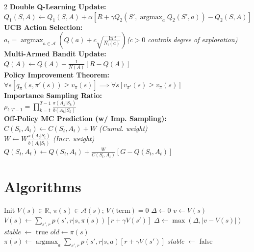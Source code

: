\documentclass[10pt]{article}
\DeclareMathOperator*{\argmax}{argmax}
\begin{document}
\begin{multicols*}{2}
	\textbf{Double Q-Learning Update:}\\
	$Q_1(S,A) \leftarrow Q_1(S,A) + \alpha[R + \gamma Q_2(S', \argmax_a Q_2(S',a)) - Q_2(S,A)]$\\[1ex]
	\textbf{UCB Action Selection:}\\
	$a_t = \argmax_{a \in \mathcal{A}}\left(Q(a) + c\sqrt{\frac{\ln{t}}{N_t(a)}}\right)$\hfill \textit{($c>0$ controls degree of exploration)}\\[1ex]
	\textbf{Multi-Armed Bandit Update:}\\
	$Q(A) \leftarrow Q(A) + \frac{1}{N(A)}[R - Q(A)]$\\[1ex]
	\textbf{Policy Improvement Theorem:}\\
	$\forall s [q_\pi(s, \pi'(s)) \ge v_\pi(s)] \implies \forall s[v_{\pi'}(s) \ge v_\pi(s)]$\\[1ex]
	\textbf{Importance Sampling Ratio:}\\
	$\rho_{t:T-1} = \prod_{k=t}^{T-1}{\frac{\pi(A_k|S_k)}{b(A_k|S_k)}}$\\[1ex]
	\textbf{Off-Policy MC Prediction (w/ Imp. Sampling):}\\
	$C(S_t, A_t) \leftarrow C(S_t, A_t) + W$ \hfill \textit{(Cumul. weight)}\\
	$W \leftarrow W \frac{\pi(A_t|S_t)}{b(A_t|S_t)}$ \hfill \textit{(Incr. weight)}\\
	$Q(S_t, A_t) \leftarrow Q(S_t, A_t) + \frac{W}{C(S_t, A_t)}[G - Q(S_t, A_t)]$

	\vspace{1ex}
	\section*{Algorithms}

	\begin{algorithm}[H]
		\caption{Policy Iteration ($V \approx v_*, \pi \approx \pi_*$)}
		\begin{algorithmic}[1]
			\State Init $V(s) \in \mathbb{R}$, $\pi(s) \in \mathcal{A}(s)$; $V(\text{term})=0$
			\Repeat
			\Repeat {}
			\State $\Delta \gets 0$
			\State $v \gets V(s)$
			\State $V(s) \gets \sum_{s', r} p(s', r | s, \pi(s)) [r + \gamma V(s')]$
			\State $\Delta \gets \max(\Delta, |v - V(s)|)$
			\EndFor
			\Until{$\Delta < \theta$}
			\State \textit{stable} $\gets$ true 
			\State $old \gets \pi(s)$
			\State $\pi(s) \gets \argmax_a \sum_{s', r} p(s', r | s, a) [r + \gamma V(s')]$
			 \textit{stable} $\gets$ false \EndIf
			\EndFor
		\end{algorithmic}
	\end{algorithm}


\end{multicols*}
\end{document}
